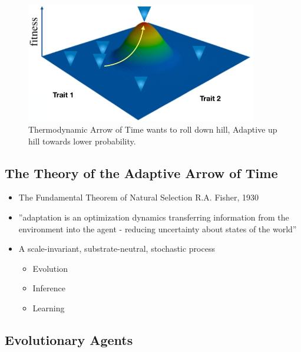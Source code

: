 \documentclass[]{article}
\begin{document}
\begin{figure}[H]
	\caption{Thermodynamic Arrow of Time wants to roll down hill, Adaptive up hill towards lower probability.}\label{fig:NaturalSelection}
	\includegraphics[width=0.9\textwidth]{NaturalSelection}
\end{figure}

\subsection{The Theory of the Adaptive Arrow of Time}

\begin{itemize}
	\item The Fundamental Theorem of Natural Selection
	R.A. Fisher, 1930
	\item ''adaptation is an optimization dynamics
	transferring information
	from the environment into the agent
	- reducing uncertainty about states of the world''\cite{rockmore2018cultural}
	\item A scale-invariant, substrate-neutral, stochastic process
	\begin{itemize}
		\item Evolution
		\item Inference
		\item Learning
	\end{itemize}
\end{itemize}

\subsection{Evolutionary Agents}
\end{document}
